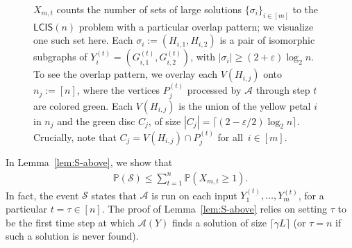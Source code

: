 \documentclass[11pt]{article}
\theoremstyle{plain}
\theoremstyle{definition}
\theoremstyle{remark}
\newcommand{\eps}{\varepsilon}
\newcommand{\MCS}{\mathsf{LCIS}}
\newcommand{\Alg}{\mathcal{A}}
\newcommand{\findManyLarge}{\mathcal{S}}
\renewcommand{\Pr}{\mathbb{P}}
\begin{document}
\begin{figure}
    \centering
    \caption{$X_{m,t}$ counts the number of sets of large solutions $\{\sigma_i\}_{i \in [m]}$ to the $\MCS(n)$ problem with a particular overlap pattern; we visualize one such set here. Each $\sigma_i := \left(H_{i,1}, H_{i,2}\right)$ is a pair of isomorphic subgraphs of $Y_i^{(t)} = \left(G_{i,1}^{(t)}, G_{i,2}^{(t)}\right)$, 
    with 
    $|\sigma_{i}| \geq (2+\eps) \log_{2} n$. 
    To see the overlap pattern, we overlay each $V(H_{i,j})$ onto $n_j := [n]$, where the vertices $P_j^{(t)}$ processed by $\Alg$ through step $t$ are colored green. Each $V(H_{i,j})$ is the union of the yellow petal $i$ in $n_j$ and the green disc $C_j$, of size $|C_j| = \lceil(2 - \eps/2)\log_2 n\rceil$. Crucially, note that $C_j = V(H_{i,j}) \cap P_j^{(t)}$ for all~$i \in [m]$.}
    \label{fig:flowers}
\end{figure}

In Lemma~\ref{lem:S-above}, we show that
\begin{align*}
    \Pr(\findManyLarge) \leq \sum_{t=1}^n \Pr(X_{m,t} \geq 1).
\end{align*}
In fact, the event $\findManyLarge$ states that $\Alg$ is run on each input $Y_1^{(t)}, \dots, Y_m^{(t)}$, for a particular $t = \tau \in [n]$. The proof of Lemma~\ref{lem:S-above} relies on setting $\tau$ to be the first time step at which $\Alg(Y)$ finds a solution of size $\lceil \gamma L \rceil$ (or $\tau = n$ if such a solution is never found).
\end{document}
